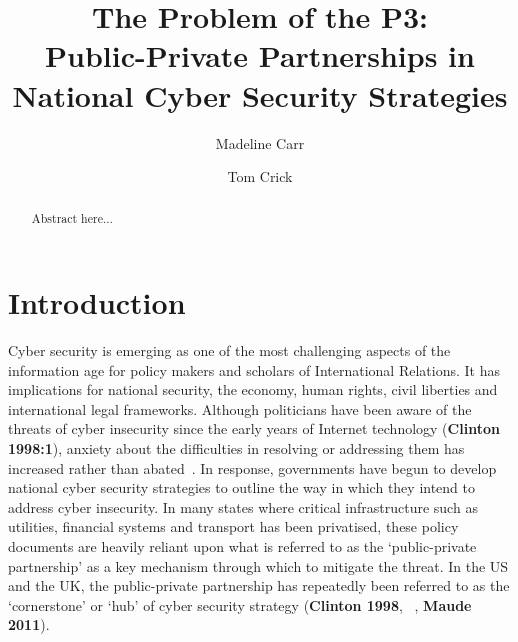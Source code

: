 \documentclass[a4paper,11pt]{article}
\title{\vspace{-4em}The Problem of the P3:\\Public-Private Partnerships in National Cyber Security Strategies}
\author[1]{Madeline Carr}
\author[2]{Tom Crick}
\affil[1]{Department of International Politics, Aberystwyth University}
\affil[2]{Department of Computing \& Information Systems, Cardiff Metropolitan University}
\affil[1]{\protect\url{madeline.carr@aber.ac.uk}}
\affil[2]{\protect\url{tcrick@cardiffmet.ac.uk}}
\date{ }
\begin{document}
\maketitle

\begin{abstract}
Abstract here...
\end{abstract}

\section{Introduction}

Cyber security is emerging as one of the most challenging aspects of
the information age for policy makers and scholars of International
Relations. It has implications for national security, the economy,
human rights, civil liberties and international legal
frameworks. Although politicians have been aware of the threats of
cyber insecurity since the early years of Internet technology
({\textbf{Clinton 1998:1}}), anxiety about the difficulties in
resolving or addressing them has increased rather than
abated~\cite{obama:2009}. In response, governments have begun to
develop national cyber security strategies to outline the way in which
they intend to address cyber insecurity. In many states where critical
infrastructure such as utilities, financial systems and transport has
been privatised, these policy documents are heavily reliant upon what
is referred to as the `public-private partnership' as a key mechanism
through which to mitigate the threat. In the US and the UK, the
public-private partnership has repeatedly been referred to as the
`cornerstone' or `hub' of cyber security strategy ({\textbf{Clinton
1998}}, ~\cite{gwbush:2003}, {\textbf{Maude 2011}}).
\end{document}
